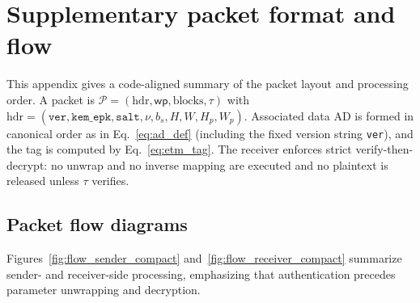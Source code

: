 \section{Supplementary packet format and flow}
\label{app:flow}

This appendix gives a code-aligned summary of the packet layout and processing order.
A packet is $\mathcal{P}=(\mathrm{hdr},\mathsf{wp},\mathrm{blocks},\tau)$ with
$\mathrm{hdr}=(\texttt{ver},\texttt{kem\_epk},\texttt{salt},\nu,b_s,H,W,H_p,W_p)$.
Associated data $\mathrm{AD}$ is formed in canonical order as in Eq.~\eqref{eq:ad_def} (including the
fixed version string \texttt{ver}), and the tag is computed by Eq.~\eqref{eq:etm_tag}.
The receiver enforces strict verify-then-decrypt: no unwrap and no inverse mapping are executed and no
plaintext is released unless $\tau$ verifies.

\subsection{Packet flow diagrams}

Figures~\ref{fig:flow_sender_compact} and~\ref{fig:flow_receiver_compact} summarize sender- and
receiver-side processing, emphasizing that authentication precedes parameter unwrapping and decryption.

